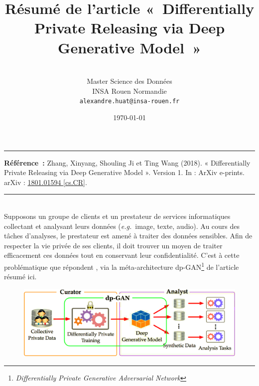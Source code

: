 \documentclass[a4paper,11pt]{article}
\title{\textbf{Résumé de l'article « Differentially Private Releasing via Deep Generative Model »}}
\author{\textbf{\AH}\\Master Science des Données\\INSA Rouen Normandie\\\texttt{alexandre.huat@insa-rouen.fr}}
\date{\today}
\theoremstyle{definition}
\newcommand{\eg}{\textit{e.g.}}
\begin{document}
\maketitle
\hrule height 1.6pt


\vspace{1em}
{\small\noindent\textbf{Référence :} Zhang, Xinyang, Shouling Ji et Ting Wang (2018). « Differentially Private Releasing via Deep Generative Model ». Version 1. In : ArXiv e-prints. arXiv : \href{http://arxiv.org/abs/1801.01594}{1801.01594 [cs.CR]}.
\vspace{1em}\hrule}
\ \\

Supposons un groupe de clients et un prestateur de services informatiques collectant et analysant leurs données (\eg\ image, texte, audio). Au cours des tâches d'analyses, le prestateur est amené à traiter des données sensibles. Afin de respecter la vie privée de ses clients, il doit trouver un moyen de traiter efficacement ces données tout en conservant leur confidentialité. C'est à cette problématique que répondent \citet{2018arXiv180101594Z}, via la méta-architecture dp-GAN\footnote{\textit{Differentially Private Generative Adversarial Network}} de l'article résumé ici.

\begin{figure}[b]
    \centering
    \includegraphics[width=0.67\linewidth]{dp-gan_role.png}
    \label{dp-gan_role}
\end{figure}
\end{document}

